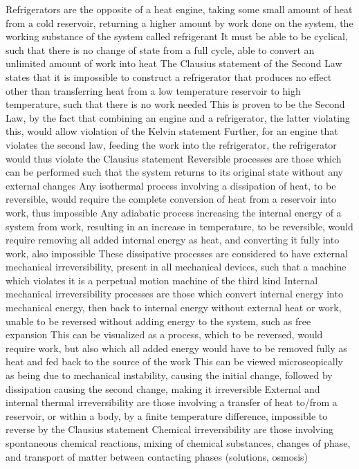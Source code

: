 \begin{outline*}
\1 Refrigerators are the opposite of a heat engine, taking some small amount of heat from a cold reservoir, returning a higher amount by work done on the system, the working substance of the system called refrigerant
\2 It must be able to be cyclical, such that there is no change of state from a full cycle, able to convert an unlimited amount of work into heat
\2 The Clausius statement of the Second Law states that it is impossible to construct a refrigerator that produces no effect other than transferring heat from a low temperature reservoir to high temperature, such that there is no work needed
\3 This is proven to be the Second Law, by the fact that combining an engine and a refrigerator, the latter violating this, would allow violation of the Kelvin statement
\3 Further, for an engine that violates the second law, feeding the work into the refrigerator, the refrigerator would thus violate the Clausius statement
\1 Reversible processes are those which can be performed such that the system returns to its original state without any external changes
\2 Any isothermal process involving a dissipation of heat, to be reversible, would require the complete conversion of heat from a reservoir into work, thus impossible
\3 Any adiabatic process increasing the internal energy of a system from work, resulting in an increase in temperature, to be reversible, would require removing all added internal energy as heat, and converting it fully into work, also impossible
\3 These dissipative processes are considered to have external mechanical irreversibility, present in all mechanical devices, such that a machine which violates it is a perpetual motion machine of the third kind
\2 Internal mechanical irreversibility processes are those which convert internal energy into mechanical energy, then back to internal energy without external heat or work, unable to be reversed without adding energy to the system, such as free expansion
\3 This can be visualized as a process, which to be reversed, would require work, but also which all added energy would have to be removed fully as heat and fed back to the source of the work
\3 This can be viewed microscopically as being due to mechanical instability, causing the initial change, followed by dissipation causing the second change, making it irreversible
\2 External and internal thermal irreversibility are those involving a transfer of heat to/from a reservoir, or within a body, by a finite temperature difference, impossible to reverse by the Clausius statement
\2 Chemical irreversibility are those involving spontaneous chemical reactions, mixing of chemical substances, changes of phase, and transport of matter between contacting phases (solutions, osmosis)

\end{outline*}
